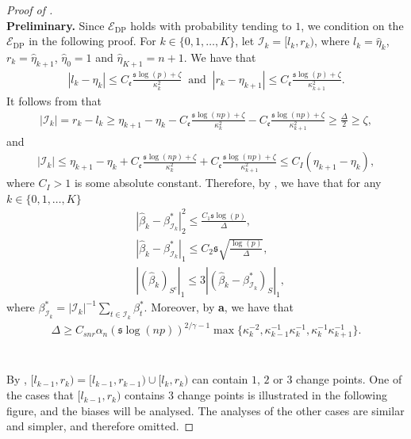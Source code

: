 \documentclass[11pt]{article}
\newcommand{\I}{{\mathcal I }}
\newcommand{\s}{ { \mathfrak{s}  } }
\theoremstyle{plain}
\theoremstyle{definition}
\begin{document}
\begin{proof}[Proof of ]
\
\\
\textbf{Preliminary.}
Since $\mathcal{E}_{\mathrm{DP}}$ holds with probability tending to $1$, we condition on the $\mathcal{E}_{\mathrm{DP}}$ in the following proof. For $k \in \{0, 1, \dots, K\}$, let $\mathcal{I}_k = [l_k, r_k)$, where $l_k = \widehat{\eta}_{k}$, $r_k = \widehat{\eta}_{k+1}$, $\widehat{\eta}_{0} = 1$ and $\widehat{\eta}_{K+1} = n+1$. We have that
\begin{align*}
    |l_k - \eta_{k}| \leq C_{\mathfrak{e}}\frac{\s \log(p) + \zeta}{\kappa_{k}^2} \;\; \text{and} \;\; |r_k - \eta_{k+1}| \leq C_{\mathfrak{e}}\frac{\s \log(p) + \zeta }{\kappa_{k+1}^2}.
\end{align*}
It follows from  that
\begin{align*}
    |\mathcal{I}_k| = r_k-l_k \geq \eta_{k+1} - \eta_{k} - C_{\mathfrak{e}}\frac{\s \log(np) + \zeta }{\kappa_{k}^2} - C_{\mathfrak{e}}\frac{\s \log(np) + \zeta }{\kappa_{k+1}^2} \geq \frac{\Delta}{2} \geq \zeta,
\end{align*}
and
\begin{align*}
    |\mathcal{I}_k| \leq \eta_{k+1} - \eta_{k} + C_{\mathfrak{e}}\frac{\s \log(np) + \zeta }{\kappa_{k}^2} + C_{\mathfrak{e}}\frac{\s \log(np) + \zeta }{\kappa_{k+1}^2} \leq C_{I}(\eta_{k+1} - \eta_{k}),
\end{align*}
where $C_{I} > 1$ is some absolute constant.
Therefore, by , we have that for any $k \in \{0, 1, \dots, K\}$
\begin{align}
&    | \widehat \beta_k -\beta^*_{\I_k}  | _2^2 \le \frac{C_1 \s\log(p)}{ \Delta  },
\label{eq:interval_lasso_k_1} \\
 &     | \widehat \beta_k  -\beta^*_{\I_k}  | _1  \le     C_2  \s\sqrt {  \frac{\log(p )} {\Delta } },
 \label{eq:interval_lasso_k_2}\\
 &     | (\widehat \beta_k  )_{S^c} | _1 \le  3  | (\widehat \beta _k  -\beta^*_{\I_k} )_{S }  | _1,\label{eq:interval_lasso_k_3}
\end{align}
where $\beta^*_{\I_k} = |\I_k|^{-1}\sum_{t \in \I_k}\beta_t^*$.
Moreover, by \textbf{a}, we have that
\begin{align}\label{eq:min_spacing_lb}
    \Delta \ge C_{snr}\alpha_n(\s\log( np))^{2/\gamma -1} \max\big\{\kappa_k^{-2}, \kappa_{k-1}^{-1}\kappa_{k}^{-1}, \kappa_{k}^{-1}\kappa_{k+1}^{-1}\big\}.
\end{align}
\\
\\
By , $[l_{k-1}, r_{k}) = [l_{k-1}, r_{k-1}) \cup [l_{k}, r_{k})$ can contain $1$, $2$ or $3$ change points. One of the cases that $[l_{k-1}, r_{k})$ contains $3$ change points is illustrated in the following figure, and the biases will be analysed. The analyses of the other cases are similar and simpler, and therefore omitted.

\end{proof}
\end{document}
